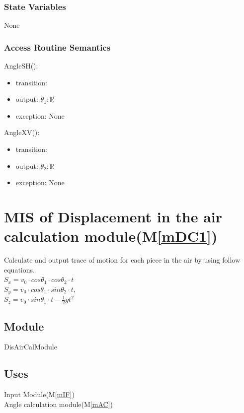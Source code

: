 \documentclass[12pt, titlepage]{article}
\newcommand{\mref}[1]{M\ref{#1}}
\begin{document}
\subsubsection{State Variables}

None

\subsubsection{Access Routine Semantics}

\noindent AngleSH():
\begin{itemize}
	\item transition:    
	\item output: $\theta_{1}: \mathbb{R}$
	\item exception: None
\end{itemize}

\noindent AngleXV():
\begin{itemize}
	\item transition:   
	\item output: $\theta_{2}: \mathbb{R}$
	\item exception: None
\end{itemize}

\section{MIS of Displacement in the air calculation module(\mref{mDC1})}

Calculate and output trace of motion for each piece in the air by using follow equations.\\
$S_{x}=v_{0}\cdot cos\theta _{1}\cdot cos\theta _{2}\cdot t$\\
$S_{y}=v_{0}\cdot cos\theta _{1}\cdot sin\theta _{2}\cdot t$,\\
$S_{z}=v_{0}\cdot sin\theta _{1}\cdot t-\frac{1}{2}gt^{2}$
\subsection{Module}

DisAirCalModule

\subsection{Uses}

Input Module(\mref{mIF})\\
Angle calculation module(\mref{mAC})\\
\end{document}
